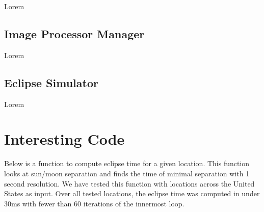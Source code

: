 \documentclass[10pt, onecolumn, draftclsnofoot, letterpaper, compsoc]{IEEEtran}
\begin{document}
Lorem

\subsection{Image Processor Manager}

Lorem

\subsection{Eclipse Simulator}

Lorem


\section{Interesting Code}

Below is a function to compute eclipse time for a given location. This function looks at sun/moon
separation and finds the time of minimal separation with 1 second resolution. We have tested
this function with locations across the United States as input. Over all tested locations, the
eclipse time was computed in under 30ms with fewer than 60 iterations of the innermost loop. \\
\end{document}
